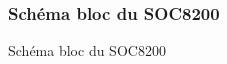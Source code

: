\begin{figure}[hbtp]
\subsubsection{Schéma bloc du SOC8200}
\caption{Schéma bloc du SOC8200}
\centering
{}
\end{figure}

\vfill
\pagebreak

